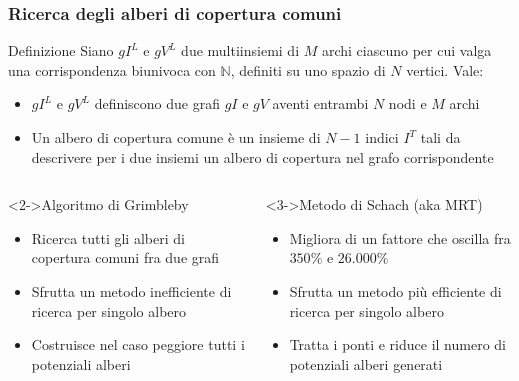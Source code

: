 \begin{frame}
 \frametitle{Ricerca degli alberi di copertura comuni}

 \begin{block}{Definizione}
  Siano $gI^L$ e $gV^L$ due multiinsiemi di $M$ archi ciascuno per cui valga una corrispondenza biunivoca con $\mathbb{N}$, definiti su uno spazio di $N$ vertici. Vale:
  \begin{itemize}
   \item $gI^L$ e $gV^L$ definiscono due grafi $gI$ e $gV$ aventi entrambi $N$ nodi e $M$ archi
   \item Un albero di copertura comune è un insieme di $N-1$ indici $I^T$ tali da descrivere per i due insiemi un albero di copertura nel grafo corrispondente
  \end{itemize}
 \end{block}

 \begin{columns}[T]
   \begin{block}<2->{Algoritmo di Grimbleby}
    \begin{itemize}
     \item Ricerca \alert<2-2>{tutti gli alberi di copertura comuni} fra due grafi
     \item Sfrutta un \alert<2-2>{metodo inefficiente} di ricerca per \alert<2-2>{singolo albero}
     \item Costruisce nel caso peggiore \alert<2-2>{tutti i potenziali alberi}
    \end{itemize}
   \end{block}
   \begin{block}<3->{Metodo di Schach (aka MRT)}
    \begin{itemize}
     \item Migliora di un fattore che oscilla fra \alert<3-3>{$350\%$} e \alert<3-3>{$26.000\%$}
     \item Sfrutta un \alert<3-3>{metodo più efficiente} di ricerca per \alert<3-3>{singolo albero}
     \item Tratta i \alert<3-3>{ponti} e riduce il numero di potenziali alberi generati
    \end{itemize}
   \end{block}
 \end{columns}
 \bigskip

\end{frame}



